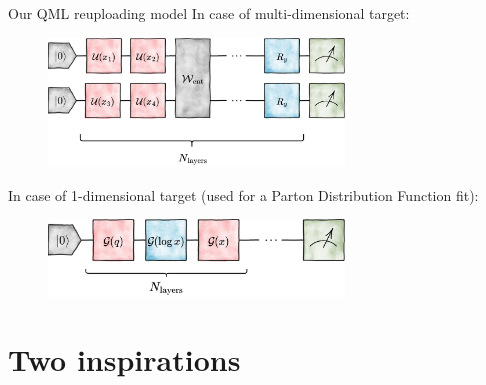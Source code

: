 \documentclass[8pt, xcolor={svgnames}, hyperref={linkcolor=black}]{beamer}
\begin{document}
\begin{frame}{Our QML reuploading model}
In case of multi-dimensional target:
\begin{figure}  
    \includegraphics[width=0.7\textwidth]{figures/4dim.png}
\end{figure}
In case of 1-dimensional target (used for a Parton Distribution Function fit):
\begin{figure}
    \includegraphics[width=0.7\textwidth]{figures/qpdf.png}
\end{figure}
\end{frame}

\section{Two inspirations}
\end{document}

